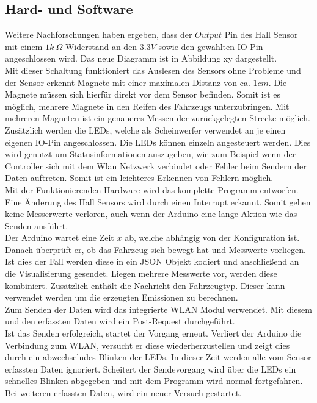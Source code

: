 \documentclass[.../Dokumentation.tex]{subfiles}
\begin{document}
    \subsection{Hard- und Software}\label{sec-ita2-hardware}
    Weitere Nachforschungen haben ergeben, dass der $Output$ Pin des Hall Sensor mit einem $1k\ \Omega$  Widerstand an den $3.3V$ sowie den gewählten IO-Pin angeschlossen wird. Das neue Diagramm ist in Abbildung xy dargestellt. \\
    Mit dieser Schaltung funktioniert das Auslesen des Sensors ohne Probleme und der Sensor erkennt Magnete mit einer maximalen Distanz von ca. $1 cm$. Die Magnete müssen sich hierfür direkt vor dem Sensor befinden. Somit ist es möglich, mehrere Magnete in den Reifen des Fahrzeugs unterzubringen. Mit mehreren Magneten ist ein genaueres Messen der zurückgelegten Strecke möglich. Zusätzlich werden die LEDs, welche als Scheinwerfer verwendet an je einen eigenen IO-Pin angeschlossen. Die LEDs können einzeln angesteuert werden. Dies wird genutzt um Statusinformationen auszugeben, wie zum Beispiel wenn der Controller sich mit dem Wlan Netzwerk verbindet oder Fehler beim Sendern der Daten auftreten. Somit ist ein leichteres Erkennen von Fehlern möglich.\\
    Mit der Funktionierenden Hardware wird das komplette Programm entworfen. Eine Änderung des Hall Sensors wird durch einen Interrupt erkannt. Somit gehen keine Messerwerte verloren, auch wenn der Arduino eine lange Aktion wie das Senden ausführt.\\
    Der Arduino wartet eine Zeit $x$ ab, welche abhängig von der Konfiguration ist. Danach überprüft er, ob das Fahrzeug sich bewegt hat und Messwerte vorliegen. Ist dies der Fall werden diese in ein JSON Objekt kodiert und anschließend an die Visualisierung gesendet. Liegen mehrere Messwerte vor, werden diese kombiniert. Zusätzlich enthält die Nachricht den Fahrzeugtyp. Dieser kann verwendet werden um die erzeugten Emissionen zu berechnen.\\
    Zum Senden der Daten wird das integrierte WLAN Modul verwendet. Mit diesem und den erfassten Daten wird ein Post-Request durchgeführt.\\
   	Ist das Senden erfolgreich, startet der Vorgang erneut. Verliert der Arduino die Verbindung zum WLAN, versucht er diese wiederherzustellen und zeigt dies durch ein abwechselndes Blinken der LEDs. In dieser Zeit werden alle vom Sensor erfassten Daten ignoriert. Scheitert der Sendevorgang wird über die LEDs ein schnelles  Blinken abgegeben und mit dem Programm wird normal fortgefahren. Bei weiteren erfassten Daten, wird ein neuer Versuch gestartet.
\end{document}
